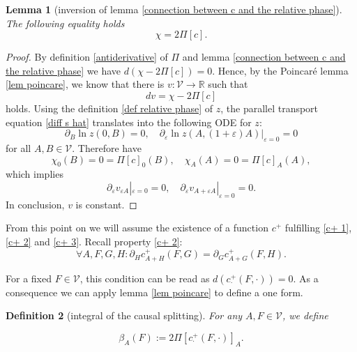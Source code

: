 \documentclass[b5paper,draft,openbib,12pt]{memoir}
\newtheorem{Def}{Definition}
\newtheorem{Lemma}[Def]{Lemma}
\begin{document}
\begin{Lemma}[inversion of lemma \ref{connection between c and the relative phase}]
The following equality holds
\begin{equation}
\chi=2 \Pi\![c].
\end{equation}
\end{Lemma}
\begin{proof}
By definition \ref{antiderivative} of \(\Pi\) and 
lemma \ref{connection between c and the relative phase}
we have \(d(\chi-2 \Pi\![c])=0\). Hence, 
by the Poincaré lemma 
\ref{lem poincare}, we know that there is 
\(v:\mathcal{V}\rightarrow \mathbb{R}\) such that
\begin{equation}
dv=\chi-2 \Pi\![c]
\end{equation}%
holds. Using the definition \ref{def relative phase} of \(z\), 
 the parallel transport equation \eqref{diff s hat} 
 translates into the 
following ODE for \(z\):
\begin{equation}
\partial_B \ln z(0,B)=0, \quad \partial_\varepsilon \ln z(A,(1+\varepsilon)A)|_{\varepsilon =0}=0
\end{equation}
for all \(A,B\in\mathcal{V}\). Therefore have
\begin{equation}
\chi_0(B)=0=\Pi\![c]_0(B), \quad \chi_{A}(A)=0=\Pi\![c]_A(A),
\end{equation}
which implies
\begin{equation}
\partial_\varepsilon v_{\varepsilon A}|_{\varepsilon=0}=0, 
\quad \partial_\varepsilon v_{A+\varepsilon A}|_{\varepsilon=0}=0.
\end{equation}
In conclusion, \(v\) is constant.
\end{proof}


From this point on we will assume the existence of  a function \(c^+\) fulfilling \eqref{c+ 1},\eqref{c+ 2} and \eqref{c+ 3}.
Recall property \eqref{c+ 2}: 
\begin{equation}
\forall A,F,G,H: \partial_H c_{A+H}^+(F,G)=\partial_G c^+_{A+G}(F,H).
\end{equation}

For a fixed \(F\in\mathcal{V}\), this condition can be read as \(d( c^+_{\cdot} (F,\cdot))=0\). As a consequence we can apply lemma \ref{lem poincare} to define a one form.

\begin{Def}[integral of the causal splitting]
For any \(A,F\in\mathcal{V}\), we define

\begin{equation}
\beta_A(F):=2 \Pi\![c^+_{\cdot}(F,\cdot)]_A.
\end{equation}
\end{Def}
\end{document}
